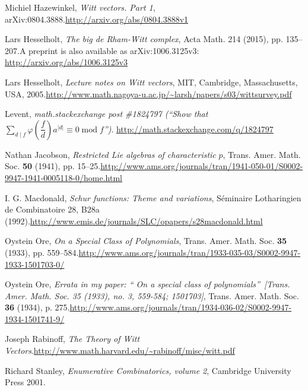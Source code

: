 \documentclass[numbers=enddot,12pt,final,onecolumn,notitlepage]{scrartcl}%
\theoremstyle{definition}
\let\sumnonlimits\sum
\renewcommand{\sum}{\sumnonlimits\limits}
\begin{document}
\begin{thebibliography}{99}
Michiel Hazewinkel, \textit{Witt vectors. Part 1},
arXiv:0804.3888.\newline\url{http://arxiv.org/abs/0804.3888v1}

Lars Hesselholt, \textit{The big de Rham-Witt
complex}, Acta Math. 214 (2015), pp. 135--207.\newline A preprint is also
available as arXiv:1006.3125v3: \url{http://arxiv.org/abs/1006.3125v3}

Lars Hesselholt, \textit{Lecture notes on Witt
vectors}, MIT, Cambridge, Massachusetts, USA, 2005.\newline\url{http://www.math.nagoya-u.ac.jp/~larsh/papers/s03/wittsurvey.pdf}

Levent, \textit{math.stackexchange post \#1824797
(\textquotedblleft Show that }$\sum_{d\mid f}\varphi\left(  \dfrac{f}%
{d}\right)  a^{\left\vert d\right\vert }\equiv0\operatorname{mod}%
f$\textit{\textquotedblright)}. \url{http://math.stackexchange.com/q/1824797}

Nathan Jacobson, \textit{Restricted Lie algebras of
characteristic }$p$, Trans. Amer. Math. Soc. \textbf{50} (1941), pp.
15--25.\newline\url{http://www.ams.org/journals/tran/1941-050-01/S0002-9947-1941-0005118-0/home.html}

I. G. Macdonald, \textit{Schur functions: Theme and
variations}, S\'{e}minaire Lotharingien de Combinatoire 28, B28a
(1992).\newline\url{http://www.emis.de/journals/SLC/opapers/s28macdonald.html}

Oystein Ore, \textit{On a Special Class of Polynomials},
Trans. Amer. Math. Soc. \textbf{35} (1933), pp. 559--584.\newline\url{http://www.ams.org/journals/tran/1933-035-03/S0002-9947-1933-1501703-0/}

Oystein Ore, \textit{Errata in my paper: \textquotedblleft
On a special class of polynomials\textquotedblright\ [Trans. Amer. Math. Soc.
35 (1933), no. 3, 559-584; 1501703]}, Trans. Amer. Math. Soc. \textbf{36}
(1934), p. 275.\newline\url{http://www.ams.org/journals/tran/1934-036-02/S0002-9947-1934-1501741-9/}

Joseph Rabinoff, \textit{The Theory of Witt
Vectors}.\newline\url{http://www.math.harvard.edu/~rabinoff/misc/witt.pdf}

Richard Stanley, \textit{Enumerative Combinatorics,
volume 2}, Cambridge University Press 2001.
\end{thebibliography}
\end{document}
